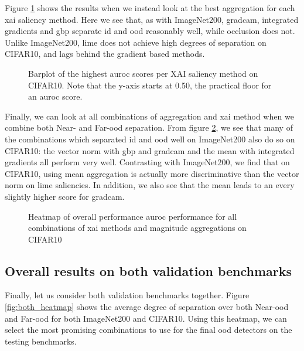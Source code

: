 \documentclass[UKenglish]{uiomasterthesis} %
\theoremstyle{definition}
\begin{document}
Figure \ref{fig:cifar10_all_generators_barplot} shows the results when we instead look at the best aggregation for each \ac{xai} saliency method. Here we see that, as with ImageNet200, \ac{gradcam}, integrated gradients and \ac{gbp} separate \ac{id} and \ac{ood} reasonably well, while occlusion does not. Unlike ImageNet200, \ac{lime} does not achieve high degrees of separation on CIFAR10, and lags behind the gradient based methods.

\begin{figure}[H]
    \begin{center}
        
    \end{center}
    \caption[Highest AUROC score for each XAI saliency method on CIFAR10]{Barplot of the highest \ac{auroc} scores per XAI saliency method on CIFAR10. Note that the y-axis starts at 0.50, the practical floor for an \ac{auroc} score.}
    \label{fig:cifar10_all_generators_barplot}
\end{figure}

Finally, we can look at all combinations of aggregation and \ac{xai} method when we combine both Near- and Far-\ac{ood} separation. From figure \ref{fig:cifar10_heatmap}, we see that many of the combinations which separated \ac{id} and \ac{ood} well on ImageNet200 also do so on CIFAR10: the vector norm with \ac{gbp} and \ac{gradcam} and the mean with integrated gradients all perform very well. Contrasting with ImageNet200, we find that on CIFAR10, using mean aggregation is actually more discriminative than the vector norm on \ac{lime} saliencies. In addition, we also see that the mean leads to an every slightly higher score for \ac{gradcam}.

\begin{figure}[H]
    \begin{center}
        
    \end{center}
    \caption[Overall performance on CIFAR10]{Heatmap of overall performance \ac{auroc} performance for all combinations of \ac{xai} methods and magnitude aggregations on CIFAR10}
    \label{fig:cifar10_heatmap}
\end{figure}


\subsection{Overall results on both validation benchmarks}

Finally, let us consider both validation benchmarks together. Figure \ref{fig:both_heatmap} shows the average degree of separation over both Near-\ac{ood} and Far-\ac{ood} for both ImageNet200 and CIFAR10. Using this heatmap, we can select the most promising combinations to use for the final \ac{ood} detectors on the testing benchmarks.
\end{document}
